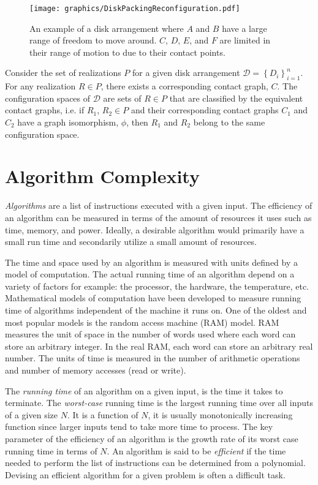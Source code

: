 \documentclass[10pt]{CSUNthesis}
\theoremstyle{plain}%
\theoremstyle{definition}
\theoremstyle{remark}
\newcommand{\DD}{{\mathcal{D}}} %
\begin{document}
\begin{figure}[!htbp]
\begin{center}
\texttt{[image: graphics/DiskPackingReconfiguration.pdf]}
\end{center} 
\caption{An example of a disk arrangement where $A$ and $B$ have a large range of freedom to move around.  $C$, $D$, $E$, and $F$ are limited in their range of motion to due to their contact points.}
\label{fig:configuration-5}
\end{figure}

Consider the set of realizations $P$ for a given disk arrangement $\DD = \left\lbrace D_i \right\rbrace_{i=1}^n$.  For any realization $R \in P$, there exists a corresponding contact graph, $C$.  The configuration spaces of $\DD$ are sets of $R \in P$ that are classified by the equivalent contact graphs, i.e. if $R_1$, $R_2 \in P$ and their corresponding contact graphs $C_1$ and $C_2$ have a graph isomorphism, $\phi$, then $R_1$ and $R_2$ belong to the same configuration space.



\section{Algorithm Complexity}
\textit{Algorithms} are a list of instructions executed with a given input.  
The efficiency of an algorithm can be measured in terms of the amount of resources it uses such as time, memory, and power.
Ideally, a desirable algorithm would primarily have a small run time and secondarily utilize a small amount of resources.

The time and space used by an algorithm is measured with units defined by a model of computation.
The actual running time of an algorithm depend on a variety of factors for example: the processor, the hardware, the temperature, etc.
Mathematical models of computation have been developed to measure running time of algorithms independent of the machine it runs on.
One of the oldest and most popular models is the random access machine (RAM) model.
RAM measures the unit of space in the number of words used where each word can store an arbitrary integer.
In the real RAM, each word can store an arbitrary real number.
The units of time is measured in the number of arithmetic operations and number of memory accesses (read or write). 

The \textit{running time} of an algorithm on a given input, is the time it takes to terminate.%
The \textit{worst-case} running time is the largest running time over all inputs of a given size $N$.  
It is a function of $N$, it is usually monotonically increasing function since larger inputs tend to take more time to process.
The key parameter of the efficiency of an algorithm is the growth rate of its worst case running time in terms of $N$.
An algorithm is said to be \textit{efficient} if the time needed to perform the list of instructions can be determined from a polynomial. 
Devising an efficient algorithm for a given problem is often a difficult task.
\end{document}
